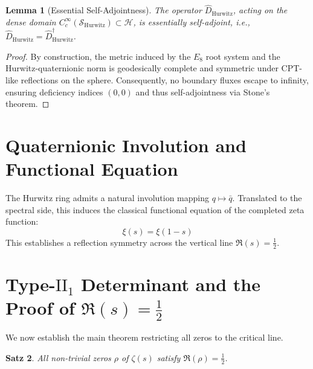 \documentclass[11pt,a4paper]{article}
\newtheorem{theorem}{Satz}
\newtheorem{lemma}[theorem]{Lemma}
\begin{document}
\begin{lemma}[Essential Self-Adjointness]
The operator $\hat{D}_{\text{Hurwitz}}$, acting on the dense domain $C_c^\infty(\mathcal{S}_{\text{Hurwitz}}) \subset \mathcal{H}$, is essentially self-adjoint, i.e., $\hat{D}_{\text{Hurwitz}} = \hat{D}_{\text{Hurwitz}}^\dagger$.
\end{lemma}
\begin{proof}
By construction, the metric induced by the $E_8$ root system and the Hurwitz-quaternionic norm is geodesically complete and symmetric under CPT-like reflections on the sphere. Consequently, no boundary fluxes escape to infinity, ensuring deficiency indices $(0,0)$ and thus self-adjointness via Stone's theorem.
\end{proof}

\section{Quaternionic Involution and Functional Equation}
The Hurwitz ring admits a natural involution mapping $q \mapsto \bar{q}$. Translated to the spectral side, this induces the classical functional equation of the completed zeta function:
\begin{equation}
    \xi(s) = \xi(1 - s)
\end{equation}
This establishes a reflection symmetry across the vertical line $\Re(s) = \frac{1}{2}$.

\section{Type-$\text{II}_1$ Determinant and the Proof of $\Re(s) = \frac{1}{2}$}

We now establish the main theorem restricting all zeros to the critical line.

\begin{theorem}
All non-trivial zeros $\rho$ of $\zeta(s)$ satisfy $\Re(\rho) = \frac{1}{2}$.
\end{theorem}
\end{document}
